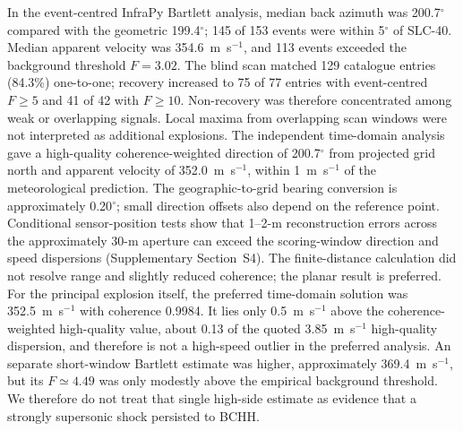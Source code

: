\documentclass[]{seismica}
\begin{document}
In the event-centred InfraPy Bartlett analysis, median back azimuth was
200.7$^\circ$ compared with the geometric 199.4$^\circ$; 145 of 153 events
were within 5$^\circ$ of SLC-40. Median apparent velocity was 354.6~m~s$^{-1}$,
and 113 events exceeded the background threshold $F=3.02$. The blind scan
matched 129 catalogue entries (84.3\%) one-to-one; recovery increased to
75 of 77 entries with event-centred $F\geq5$ and 41 of 42 with $F\geq10$.
Non-recovery was therefore concentrated among weak or overlapping signals.
Local maxima from overlapping scan windows were not interpreted as additional
explosions. The independent time-domain analysis gave a high-quality
coherence-weighted direction of
200.7$^\circ$ from projected grid north and apparent velocity of
352.0~m~s$^{-1}$, within 1~m~s$^{-1}$ of the meteorological prediction.
The geographic-to-grid bearing conversion is approximately 0.20$^\circ$;
small direction offsets also depend on the reference point. Conditional
sensor-position tests show that 1--2-m reconstruction errors across the
approximately 30-m aperture can exceed the scoring-window direction and
speed dispersions (Supplementary Section~S4). The
finite-distance calculation did not resolve range and slightly reduced
coherence; the planar result is preferred. For the principal explosion itself,
the preferred time-domain solution was 352.5~m~s$^{-1}$ with coherence 0.9984.
It lies only 0.5~m~s$^{-1}$ above the coherence-weighted high-quality value,
about 0.13 of the quoted 3.85~m~s$^{-1}$ high-quality dispersion, and therefore
is not a high-speed outlier in the preferred analysis. An
separate short-window Bartlett estimate was higher, approximately
369.4~m~s$^{-1}$, but its $F\simeq4.49$ was only modestly above the empirical
background threshold. We therefore do not treat that single high-side estimate
as evidence that a strongly supersonic shock persisted to BCHH.
\end{document}
